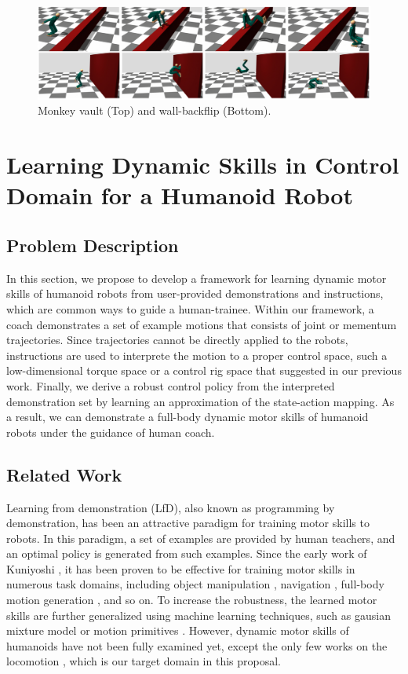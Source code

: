 \begin{figure}[htbp]
\center
  \includegraphics[width=\linewidth]{images/training1_teaser}
  \caption{Monkey vault (Top) and wall-backflip (Bottom).}
 \label{fig:training1_teaser}
\end{figure}


\section{Learning Dynamic Skills in Control Domain for a Humanoid Robot}

\subsection{Problem Description}

In this section, we propose to develop a framework for learning
dynamic motor skills of humanoid robots from user-provided demonstrations 
and instructions, which are common ways to guide a human-trainee.
Within our framework, a coach demonstrates a set of example motions
that consists of joint or mementum trajectories. 
Since trajectories cannot be directly applied to the robots,
instructions are used to interprete the motion to a proper
control space, such a low-dimensional torque space or a control rig 
space \cite{Ha:2014:ITD} that suggested in our previous work.
Finally, we derive a robust control policy from the interpreted
demonstration set by learning an approximation of the state-action mapping.
As a result, we can demonstrate a full-body dynamic motor skills
of humanoid robots under the guidance of human coach.

\subsection{Related Work}

Learning from demonstration (LfD), also known as programming by demonstration,
has been an attractive paradigm for training motor skills to robots.
In this paradigm, a set of examples are provided by human teachers,
and an optimal policy is generated from such examples.
Since the early work of Kuniyoshi \etal \cite{kuniyoshi:1989:TBS},
it has been proven to be effective for training motor skills in
numerous task domains, including object manipulation 
\cite{Atkeson:1997:RLD,Calinon:2007:LRG,Ueda:2010:MNH},
navigation \cite{Konidaris:2011:RLD}, 
full-body motion generation \cite{Kulic:2011:ILF}, and so on.
To increase the robustness, the learned motor skills are further 
generalized using machine learning techniques,
such as gausian mixture model \cite{Calinon:2007:LRG} or
motion primitives \cite{Pastor:2009:LGM}.
However, dynamic motor skills of humanoids have
not been fully examined yet, except the only few works on the
locomotion \cite{Nakanishi:2004:LDA}, which is our target domain
in this proposal.

